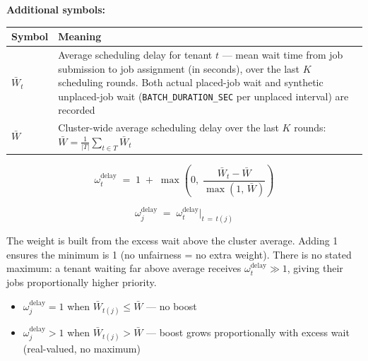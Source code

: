 \documentclass[11pt]{article}
\newcommand{\omdelay}{\omega_j^{\text{delay}}}
\newcommand{\omdelayt}{\omega_t^{\text{delay}}}
\begin{document}
\medskip
\noindent\textbf{Additional symbols:}

\begin{center}
\begin{tabular}{@{}l p{10.5cm}@{}}
\toprule
Symbol & Meaning \\
\midrule
$\bar{W}_t$ & Average scheduling delay for tenant $t$ --- mean wait time from
  job submission to job assignment (in seconds), over the last $K$ scheduling
  rounds. Both actual placed-job wait and synthetic unplaced-job wait
  (\texttt{BATCH\_DURATION\_SEC} per unplaced interval) are recorded \\[6pt]
$\bar{W}$ & Cluster-wide average scheduling delay over the last $K$ rounds:
  $\displaystyle\bar{W} = \frac{1}{|T|}\sum_{t \in T} \bar{W}_t$ \\
\bottomrule
\end{tabular}
\end{center}

\[
  \omdelayt \;=\; 1 \;+\; \max\!\left(0,\;
    \frac{\bar{W}_t - \bar{W}}{\max\!\left(1,\, \bar{W}\right)}
    \right)
\]

\[
  \omdelay \;=\; \omdelayt\big|_{t\,=\,t(j)}
\]

The weight is built from the excess wait above the cluster average. Adding 1
ensures the minimum is 1 (no unfairness = no extra weight). There is no stated
maximum: a tenant waiting far above average receives $\omdelayt \gg 1$, giving
their jobs proportionally higher priority.

\begin{itemize}[noitemsep, topsep=4pt]
  \item $\omdelay = 1$ when $\bar{W}_{t(j)} \leq \bar{W}$ --- no boost
  \item $\omdelay > 1$ when $\bar{W}_{t(j)} > \bar{W}$ --- boost grows
    proportionally with excess wait (real-valued, no maximum)
\end{itemize}
\end{document}
